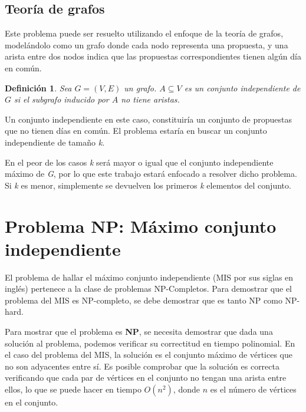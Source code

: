\documentclass[10pt]{article} %
\newtheorem{mydef}{Definici\'on}%
\begin{document}
	
	\subsection{Teor\'ia de grafos}
	Este problema puede ser resuelto utilizando el enfoque de la teoría de grafos, model\'andolo como un grafo donde cada nodo representa una propuesta, y una arista entre dos nodos indica que las propuestas correspondientes tienen alg\'un d\'ia en com\'un. 
	
	\begin{mydef}
		Sea $G = (V, E)$ un grafo. $A \subseteq V$ es un conjunto independiente de $G$ si el subgrafo inducido por $A$ no tiene aristas.  
	\end{mydef}
	
	Un conjunto independiente en este caso, constituir\'ia un conjunto de propuestas que no tienen d\'ias en com\'un. El problema estar\'ia en buscar un conjunto independiente de tama\~no \textit{k}.
	
	En el peor de los casos \textit{k} ser\'a mayor o igual que el conjunto independiente m\'aximo de \textit{G}, por lo que este trabajo estar\'a enfocado a resolver dicho problema. Si \textit{k} es menor, simplemente se devuelven los primeros \textit{k} elementos del conjunto.
	
	\section{Problema NP: M\'aximo conjunto independiente}
	
	El problema de hallar el m\'aximo conjunto independiente (MIS por sus siglas en ingl\'es) pertenece a la clase de problemas NP-Completos. Para demostrar que el problema del MIS es NP-completo, se debe demostrar que es tanto NP como NP-hard.
	
	Para mostrar que el problema es \textbf{NP}, se necesita demostrar que dada una solución al problema, podemos verificar su correctitud en tiempo polinomial. En el caso del problema del MIS, la solución es el conjunto m\'aximo de vértices que no son adyacentes entre sí. Es posible comprobar que la solución es correcta verificando que cada par de vértices en el conjunto no tengan una arista entre ellos, lo que se puede hacer en tiempo $O(n^{2})$, donde $n$ es el n\'umero de v\'ertices en el conjunto.
	
\end{document}
